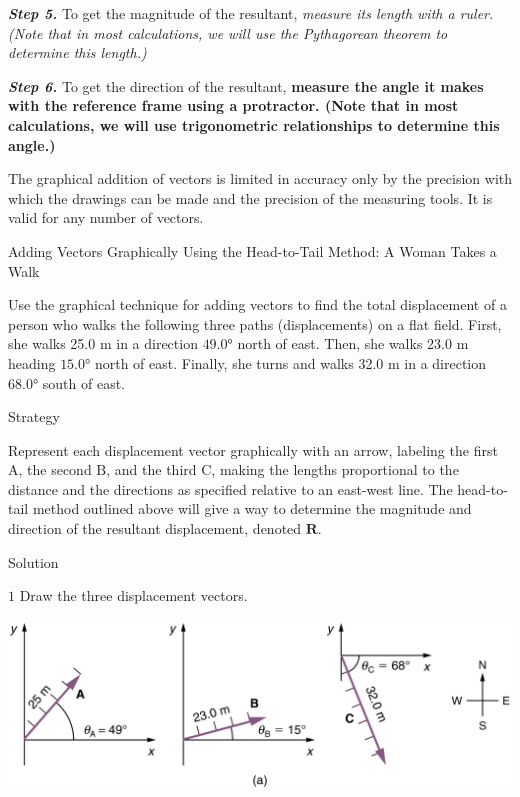 \documentclass[
]{book}
\begin{document}
\textbf{\emph{Step 5.}} To get the \protect\hypertarget{import-auto-id1165298794109}{}{magnitude} of the resultant, \emph{measure its length with a ruler.
(Note that in most calculations, we will use the Pythagorean theorem to
determine this length.)}

\textbf{\emph{Step 6.}} To get the \protect\hypertarget{import-auto-id1165298932041}{}{direction} of the resultant, \textbf{measure the angle it makes with
the reference frame using a protractor. (Note that in most calculations,
we will use trigonometric relationships to determine this angle.)}

The graphical addition of vectors is limited in accuracy only by the
precision with which the drawings can be made and the precision of the
measuring tools. It is valid for any number of vectors.

\hypertarget{fs-id1165296298332}{}
Adding Vectors Graphically Using the Head-to-Tail Method: A Woman Takes
a Walk

Use the graphical technique for adding vectors to find the total
displacement of a person who walks the following three paths
(displacements) on a flat field. First, she walks 25.0 m in a direction
\(\text{49.0°}{}\) north of east. Then, she walks 23.0 m heading
\(\text{15.0°}{}\) north of east. Finally, she turns and walks 32.0 m in a
direction 68.0° south of east.

{Strategy}

Represent each displacement vector graphically with an arrow, labeling
the first \(\text{A}{}\), the second \(\text{B}{}\), and the third
\(\text{C}{}\), making the lengths proportional to the distance and the
directions as specified relative to an east-west line. The head-to-tail
method outlined above will give a way to determine the magnitude and
direction of the resultant displacement, denoted \(\textbf{R}{}\).

{Solution}

\(1\) Draw the three displacement vectors.

\includegraphics{images/Figure_03_02_08.jpg}
\end{document}
